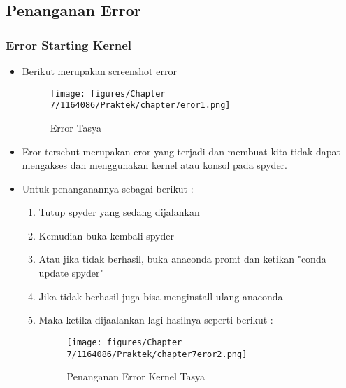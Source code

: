 \subsection{Penanganan Error}
\subsubsection{Error Starting Kernel}
\begin{itemize}
\item Berikut merupakan screenshot error
\begin{figure}[ht]
\centering
\texttt{[image: figures/Chapter 7/1164086/Praktek/chapter7eror1.png]}
\caption{Error Tasya}
\label{Error}
\end{figure}

\item Eror tersebut merupakan eror yang terjadi dan membuat kita tidak dapat mengakses dan menggunakan kernel atau konsol pada spyder.

\item Untuk penanganannya sebagai berikut :
\begin{enumerate}
\item Tutup spyder yang sedang dijalankan
\item Kemudian buka kembali spyder
\item Atau jika tidak berhasil, buka anaconda promt dan ketikan "conda update spyder"
\item Jika tidak berhasil juga bisa menginstall ulang anaconda
\item Maka ketika dijaalankan lagi hasilnya seperti berikut :
\begin{figure}[ht]
\centering
\texttt{[image: figures/Chapter 7/1164086/Praktek/chapter7eror2.png]}
\caption{Penanganan Error Kernel Tasya}
\label{Error}
\end{figure}
\end{enumerate}
\end{itemize}
